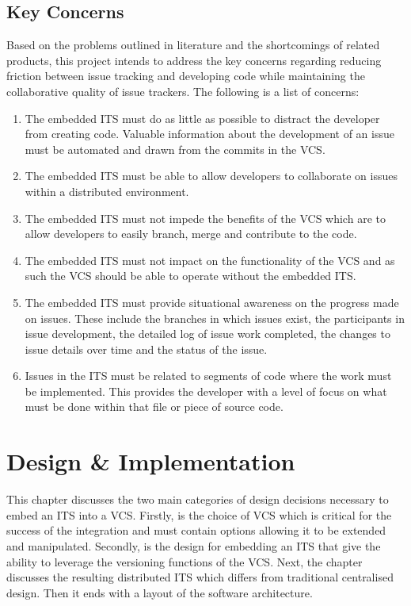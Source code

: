 \documentclass{mproj}
\begin{document}
\section{Key Concerns}

Based on the problems outlined in literature and the shortcomings of related products, this project intends to address the key concerns regarding reducing friction between issue tracking and developing code while maintaining the collaborative quality of issue trackers. The following is a list of concerns:

\begin{enumerate}
  \item The embedded ITS must do as little as possible to distract the developer from creating code. Valuable information about the development of an issue must be automated and drawn from the commits in the VCS.
  \item The embedded ITS must be able to allow developers to collaborate on issues within a distributed environment.
  \item The embedded ITS must not impede the benefits of the VCS which are to allow developers to easily branch, merge and contribute to the code.
  \item The embedded ITS must not impact on the functionality of the VCS and as such the VCS should be able to operate without the embedded ITS.
  \item The embedded ITS must provide situational awareness on the progress made on issues. These include the branches in which issues exist, the participants in issue development, the detailed log of issue work completed, the changes to issue details over time and the status of the issue.
  \item Issues in the ITS must be related to segments of code where the work must be implemented. This provides the developer with a level of focus on what must be done within that file or piece of source code.
\end{enumerate}



\chapter{Design {\&} Implementation}\label{design}

This chapter discusses the two main categories of design decisions necessary to embed an ITS into a VCS. Firstly, is the choice of VCS which is critical for the success of the integration and must contain options allowing it to be extended and manipulated. Secondly, is the design for embedding an ITS that give the ability to leverage the versioning functions of the VCS. Next, the chapter discusses the resulting distributed ITS which differs from traditional centralised design. Then it ends with a layout of the software architecture.
\end{document}
